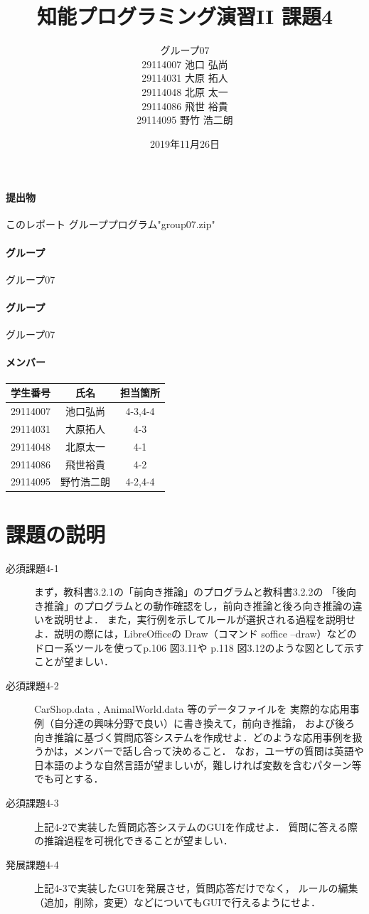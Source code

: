 \documentclass{jarticle}
\title{知能プログラミング演習II 課題4}
\author{グループ07\\
    29114007 池口 弘尚\\
    29114031 大原 拓人\\
    29114048 北原 太一\\
    29114086 飛世 裕貴\\
    29114095 野竹 浩二朗\\
}
\date{2019年11月26日}
\begin{document}
\maketitle

\paragraph{提出物} このレポート グループプログラム"group07.zip"
\paragraph{グループ} グループ07
\paragraph{グループ} グループ07
\paragraph{メンバー}
\begin{tabular}{|c|c|c|}
    \hline
    学生番号&氏名&担当箇所\\
    \hline\hline
    29114007&池口弘尚&4-3,4-4\\
    \hline
    29114031&大原拓人&4-3\\
    \hline
    29114048&北原太一&4-1\\
    \hline
    29114086&飛世裕貴&4-2\\
    \hline
    29114095&野竹浩二朗&4-2,4-4\\
    \hline
\end{tabular}

\section{課題の説明}
\begin{description}
    \item[必須課題4-1] まず，教科書3.2.1の「前向き推論」のプログラムと教科書3.2.2の
    「後向き推論」のプログラムとの動作確認をし，前向き推論と後ろ向き推論の違いを説明せよ．
    また，実行例を示してルールが選択される過程を説明せよ．説明の際には，LibreOfficeの
    Draw（コマンド soffice --draw）などのドロー系ツールを使ってp.106 図3.11や
    p.118 図3.12のような図として示すことが望ましい．
    \item[必須課題4-2] CarShop.data , AnimalWorld.data 等のデータファイルを
    実際的な応用事例（自分達の興味分野で良い）に書き換えて，前向き推論，
    および後ろ向き推論に基づく質問応答システムを作成せよ．どのような応用事例を扱うかは，メンバーで話し合って決めること．
    なお，ユーザの質問は英語や日本語のような自然言語が望ましいが，難しければ変数を含むパターン等でも可とする．
    \item[必須課題4-3] 上記4-2で実装した質問応答システムのGUIを作成せよ．
    質問に答える際の推論過程を可視化できることが望ましい．
    \item[発展課題4-4] 上記4-3で実装したGUIを発展させ，質問応答だけでなく，
    ルールの編集（追加，削除，変更）などについてもGUIで行えるようにせよ．
\end{description}
\end{document}
